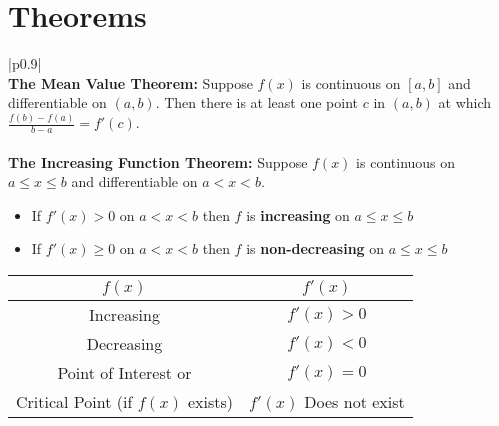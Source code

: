 \documentclass[12pt]{report}
\newenvironment{boxe}
    {\begin{center}
    \begin{tabular}{|p{0.9\textwidth}|}
    \hline\\
    }
    { 
    \\\\\hline
    \end{tabular} 
    \end{center}
    }
\begin{document}
\section*{Theorems}
\begin{boxe}
    \textbf{The Mean Value Theorem:} Suppose $f(x)$ is continuous on $[a,b]$ and differentiable on $(a,b)$. Then there is at least one point $c$ in $(a,b)$ at which $\displaystyle{\frac{f(b)-f(a)}{b-a}=f'(c)}$.\\\\

    \textbf{The Increasing Function Theorem:} Suppose $f(x)$ is continuous on $a\leq x\leq b$ and differentiable on $a< x< b$.
    \begin{itemize}
        \item If $f'(x)> 0$ on $a< x< b$ then $f$ is \textbf{increasing} on $a\leq x\leq b$
        \item If $f'(x)\geq 0$ on $a< x< b$ then $f$ is \textbf{non-decreasing} on $a\leq x\leq b$
    \end{itemize}
    
    \iffalse\textbf{The Racetrack Principle:}
    Suppose $g$ and $h$ are continuous on $a\leq x\leq b$ and differentiable on $a< x< b$ and $g'(x)\leq h'(x)$ on $a< x< b$.
    \begin{itemize}
        \item If $g(a)=h(a)$ then $g(x)\leq h(x)$ on $a\leq x\leq b$
        \item If $g(b)=h(b)$ then $g(x)\geq h(x)$ on $a\leq x\leq b$
    \end{itemize}
    \fi
    \begin{center}
        \begin{tabular}{c|c}
            $f(x)$ & $f'(x)$\\
            \hline
            Increasing & $f'(x)>0$ \\
            \hline
            Decreasing & $f'(x)<0$ \\ \hline

             Point of Interest or& $f'(x)=0$ \\
             Critical Point (if $f(x)$ exists) & $f'(x)$ Does not exist \\
            \hline
        
        \end{tabular}
        \end{center}
\end{boxe}
\end{document}
